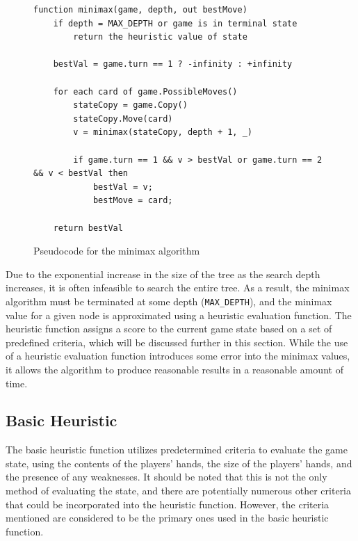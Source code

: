 \begin{figure}[h]
\captionsetup{justification=centering}
\begin{lstlisting}
function minimax(game, depth, out bestMove)
    if depth = MAX_DEPTH or game is in terminal state
        return the heuristic value of state
        
    bestVal = game.turn == 1 ? -infinity : +infinity
        
    for each card of game.PossibleMoves()
        stateCopy = game.Copy()
        stateCopy.Move(card)
        v = minimax(stateCopy, depth + 1, _)
		
        if game.turn == 1 && v > bestVal or game.turn == 2 && v < bestVal then
            bestVal = v;
            bestMove = card;
			
    return bestVal
\end{lstlisting}
\caption{Pseudocode for the minimax algorithm}
\label{fig:minimaxPseudocode}
\end{figure}

Due to the exponential increase in the size of the tree as the search depth increases, it is often infeasible to search the entire tree. As a result, the minimax algorithm must be terminated at some depth (\texttt{MAX\_DEPTH}), and the minimax value for a given node is approximated using a heuristic evaluation function. The heuristic function assigns a score to the current game state based on a set of predefined criteria, which will be discussed further in this section. While the use of a heuristic evaluation function introduces some error into the minimax values, it allows the algorithm to produce reasonable results in a reasonable amount of time.

\subsection{Basic Heuristic}
The basic heuristic function utilizes predetermined criteria to evaluate the game state, using the contents of the players' hands, the size of the players' hands, and the presence of any weaknesses. It should be noted that this is not the only method of evaluating the state, and there are potentially numerous other criteria that could be incorporated into the heuristic function. However, the criteria mentioned are considered to be the primary ones used in the basic heuristic function.

